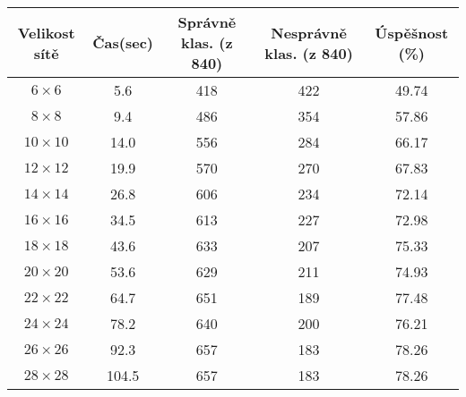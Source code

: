 \documentclass[12pt]{article}
\begin{document}
\begin{center}
	\begin{tabular}{||c c c c c||} 
		\hline
		Velikost sítě & Čas(sec) & Správně klas. (z 840) & Nesprávně klas. (z 840) & Úspěšnost (\%) \\ [0.5ex] 
		\hline
		$6\times6$ & 5.6 & 418 & 422 & 49.74 \\ 
		\hline
		$8\times8$ & 9.4 & 486 & 354 & 57.86 \\
		\hline
		$10\times10$ & 14.0 & 556 & 284 & 66.17  \\
		\hline
		$12\times12$ & 19.9 & 570 & 270 & 67.83 \\
		\hline
		$14\times14$ & 26.8 & 606 & 234 & 72.14 \\
		\hline
		$16\times16$ & 34.5 & 613 & 227 & 72.98 \\
		\hline
		$18\times18$ & 43.6 & 633 & 207 & 75.33 \\
		\hline
		$20\times20$ & 53.6 & 629 & 211 & 74.93 \\
		\hline
		$22\times22$ & 64.7 & 651 & 189 & 77.48 \\
		\hline
		$24\times24$ & 78.2 & 640 & 200 & 76.21 \\
		\hline
		$26\times26$ & 92.3 & 657 & 183 & 78.26 \\
		\hline
		$28\times28$ & 104.5 & 657 & 183 & 78.26 \\
		\hline
	\end{tabular}
\end{center}
\end{document}

